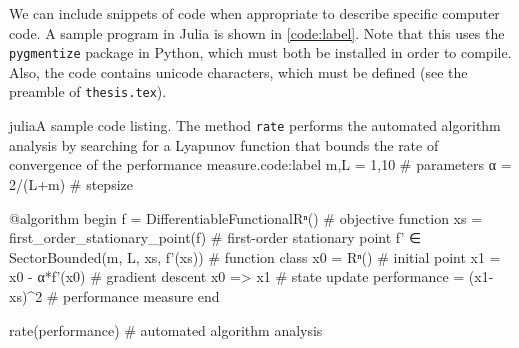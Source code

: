 We can include snippets of code when appropriate to describe specific computer code. A sample program in Julia is shown in \cref{code:label}. Note that this uses the \texttt{pygmentize} package in Python, which must both be installed in order to compile. Also, the code contains unicode characters, which must be defined (see the preamble of \texttt{thesis.tex}).

\begin{code}{julia}{A sample code listing. The method \texttt{rate} performs the automated algorithm analysis by searching for a Lyapunov function that bounds the rate of convergence of the performance measure.}{code:label}
m,L = 1,10                                   # parameters
α = 2/(L+m)                                  # stepsize

@algorithm begin
	f = DifferentiableFunctional{Rⁿ}()       # objective function
	xs = first_order_stationary_point(f)     # first-order stationary point
	f' ∈ SectorBounded(m, L, xs, f'(xs))     # function class
	x0 = Rⁿ()                                # initial point
	x1 = x0 - α*f'(x0)                       # gradient descent
	x0 => x1                                 # state update
	performance = (x1-xs)^2                  # performance measure
end

rate(performance)                            # automated algorithm analysis
\end{code}

